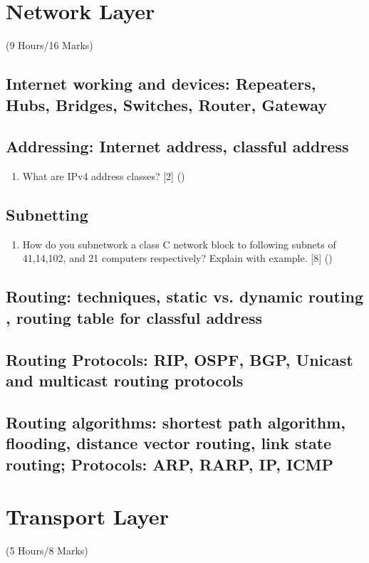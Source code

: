 \documentclass[12pt]{article}
\begin{document}
	\pagebreak

\section{Network Layer}
	\begin{center}(9 Hours/16 Marks)\end{center}
	\subsection{Internet working and devices: Repeaters, Hubs, Bridges, Switches, Router, Gateway}
	\subsection{Addressing: Internet address, classful address}
		\begin{enumerate}[noitemsep, topsep=0pt]
			\item What are IPv4 address classes? \hfill [2] ()
		\end{enumerate}

	\subsection{Subnetting}
		\begin{enumerate}[noitemsep, topsep=0pt]
			\item How do you subnetwork a class C network block to following subnets of 41,14,102, and 21 computers respectively? Explain with example. \hfill [8] ()
		\end{enumerate}

	\subsection{Routing: techniques, static vs. dynamic routing , routing table for classful address}
	\subsection{Routing Protocols: RIP, OSPF, BGP, Unicast and multicast routing protocols}
	\subsection{Routing algorithms: shortest path algorithm, flooding, distance vector routing, link state routing; Protocols: ARP, RARP, IP, ICMP}

	\pagebreak
\section{Transport Layer}
	\begin{center}(5 Hours/8 Marks)\end{center}
\end{document}
